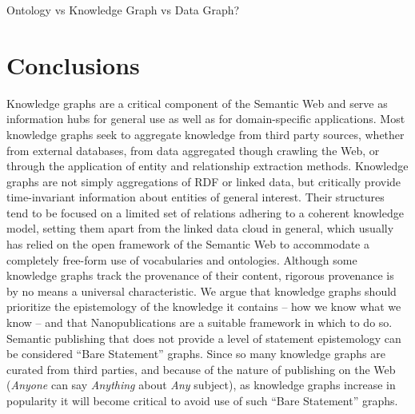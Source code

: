 \documentclass[runningheads,a4paper]{llncs}
\begin{document}
Ontology vs Knowledge Graph vs Data Graph?

\section{Conclusions}

Knowledge graphs are a critical component of the Semantic Web and serve as information hubs for general use as well as for domain-specific applications.
Most knowledge graphs seek to aggregate knowledge from third party sources, whether from external databases, from data aggregated though crawling the Web, or through the application of entity and relationship extraction methods.
Knowledge graphs are not simply aggregations of RDF or linked data, but critically provide time-invariant information about entities of general interest.
Their structures tend to be focused on a limited set of relations adhering to a coherent knowledge model, setting them apart from the linked data cloud in general, which usually has relied on the open framework of the Semantic Web to accommodate a completely free-form use of vocabularies and ontologies.
Although some knowledge graphs track the provenance of their content, rigorous provenance is by no means a universal characteristic.
We argue that knowledge graphs should prioritize the epistemology of the knowledge it contains -- how we know what we know -- and that Nanopublications are a suitable framework in which to do so.
Semantic publishing that does not provide a level of statement epistemology can be considered ``Bare Statement'' graphs.
Since so many knowledge graphs are curated from third parties, and because of the nature of publishing on the Web (\textit{Anyone} can say \textit{Anything} about \textit{Any} subject), as knowledge graphs increase in popularity it will become critical to avoid use of such ``Bare Statement'' graphs.

\FloatBarrier


\end{document}
